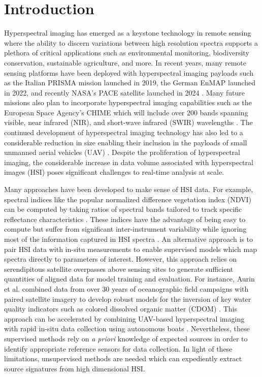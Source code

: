 \documentclass[remotesensing,article,submit,pdftex,moreauthors]{Definitions/mdpi}
\begin{document}

\section{Introduction}


Hyperspectral imaging has emerged as a keystone technology in remote sensing where the ability to discern variations between high resolution spectra supports a plethora of critical applications such as environmental monitoring, biodiversity conservation, sustainable agriculture, and more. In recent years, many remote sensing platforms have been deployed with hyperspectral imaging payloads such as the Italian PRISMA mission launched in 2019, the German EnMAP launched in 2022, and recently NASA's PACE satellite launched in 2024 \cite{PRISMA-orig, EnMAP-orig, PACE-orig}. Many future missions also plan to incorporate hyperspectral imaging capabilities such as the European Space Agency's CHIME which will include over $200$ bands spanning visible, near infrared (NIR), and short-wave infrared (SWIR) wavelengths \cite{CHIME-orig}. The continued development of hyperspectral imaging technology has also led to a considerable reduction in size enabling their inclusion in the payloads of small unmanned aerial vehicles (UAV) \cite{adao2017hyperspectral, arroyo2019implementation}. Despite the proliferation of hyperspectral imaging, the considerable increase in data volume associated with hyperspectral images (HSI) poses significant challenges to real-time analysis at scale.

Many approaches have been developed to make sense of HSI data. For example, spectral indices like the popular normalized difference vegetation index (NDVI) can be computed by taking ratios of spectral bands tailored to track specific reflectance characteristics \cite{thenkabail-indices,thenkabail2018hyperspectral}. These indices have the advantage of being easy to compute but suffer from significant inter-instrument variability while ignoring most of the information captured in HSI spectra \cite{ndvi-variability}. An alternative approach is to pair HSI data with in-situ measurements to enable supervised models which map spectra directly to parameters of interest. However, this approach relies on serendipitous satellite overpasses above sensing sites to generate sufficient quantities of aligned data for model training and evaluation. For instance, Aurin et al. combined data from over 30 years of oceanographic field campaigns with paired satellite imagery to develop robust models for the inversion of key water quality indicators such as colored dissolved organic matter (CDOM) \cite{aurin2018remote}. This approach can be accelerated by combining UAV-based hyperspectral imaging with rapid in-situ data collection using autonomous boats \cite{robot-team-1, robot-team-2}. Nevertheless, these supervised methods rely on \textit{a priori} knowledge of expected sources in order to identify appropriate reference sensors for data collection. In light of these limitations, unsupervised methods are needed which can expediently extract source signatures from high dimensional HSI.
\end{document}
